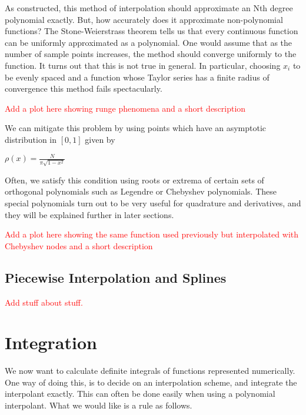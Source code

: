 \documentclass[12pt,letterpaper]{article}
\numberwithin{equation}{section}
\begin{document}
\indent As constructed, this method of interpolation should approximate an Nth degree polynomial exactly. But, how accurately does it approximate non-polynomial functions? The Stone-Weierstrass theorem tells us that every continuous function can be uniformly approximated as a polynomial. One would assume that as the number of sample points increases, the method should converge uniformly to the function. It turns out that this is not true in general. In particular, choosing $x_i$ to be evenly spaced and a function whose Taylor series has a finite radius of convergence this method fails spectacularly.
\begin{center}
\textcolor{red}{Add a plot here showing runge phenomena and a short description}
\end{center}

\indent We can mitigate this problem by using points which have an asymptotic distribution in $[0,1]$ given by
\begin{center}
$\rho(x) = \frac{N}{\pi \sqrt{1 - x^2}}$
\end{center}

\indent Often, we satisfy this condition using roots or extrema of certain sets of orthogonal polynomials such as Legendre or Chebyshev polynomials. These special polynomials turn out to be very useful for quadrature and derivatives, and they will be explained further in later sections.

\begin{center}
\textcolor{red}{Add a plot here showing the same function used previously but interpolated with Chebyshev nodes and a short description}
\end{center}

\subsection{Piecewise Interpolation and Splines}
\begin{center}
\textcolor{red}{Add stuff about stuff.}
\end{center}

\section{Integration}
We now want to calculate definite integrals of functions represented numerically. One way of doing this, is to decide on an interpolation scheme, and integrate the interpolant exactly. This can often be done easily when using a polynomial interpolant. What we would like is a rule as follows.
\end{document}
